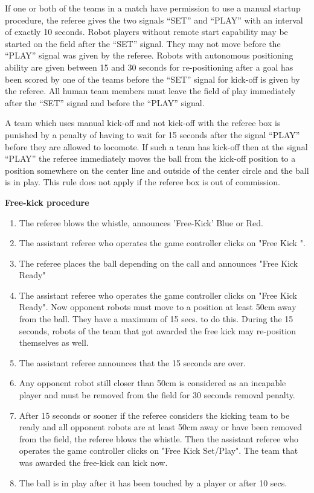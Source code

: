 \bigskip

If one or both of the teams in a match have permission to use a manual startup procedure, the referee gives the two signals ``SET'' and ``PLAY'' with an interval of exactly
10 seconds. Robot players without remote start capability may be started on the field after the ``SET'' signal. They may not move before the ``PLAY'' signal was given
by the referee. Robots with autonomous positioning ability are given between 15 and 30 seconds for re-positioning after a goal has been scored by one of the teams before the ``SET'' signal for kick-off is given by the referee. All human team members must leave the field of play
immediately after the ``SET'' signal and before the ``PLAY'' signal.

A team which uses manual kick-off and not kick-off with the referee box is punished by a penalty of having to wait for 15 seconds after the signal ``PLAY'' before they are
allowed to locomote. If such a team has kick-off then at the signal ``PLAY'' the referee immediately moves the ball from the kick-off position to a position somewhere on
the center line and outside of the center circle and the ball is in play. This rule does not apply if the referee box is out of commission.

\bigskip


{\bfseries Free-kick procedure}

\begin{enumerate}
\item The referee blows the whistle, announces 'Free-Kick'  Blue or Red.
\item The assistant referee who operates the game controller clicks on "Free Kick  ".
\item The referee places the ball depending on the call and announces "Free Kick Ready"
\item The assistant referee who operates the game controller clicks on "Free Kick   Ready". Now opponent robots must move to a position at least 50cm away from the ball. They have a maximum of 15 secs. to do this.  During the 15 seconds, robots of the team that got awarded the free kick may re-position themselves as well.
\item The assistant referee announces that the 15 seconds are over.
\item Any opponent robot still closer than 50cm is considered as an incapable player and must be removed from the field for 30 seconds removal penalty.
\item After 15 seconds or sooner if the referee considers the kicking team to be ready and all opponent robots are at least 50cm away or have been removed from the field, the referee blows the whistle. Then the assistant referee who operates the game controller clicks on "Free Kick   Set/Play". The team that was awarded the free-kick can kick now.
\item The ball is in play after it has been touched by a player or after 10 secs.
\end{enumerate}

